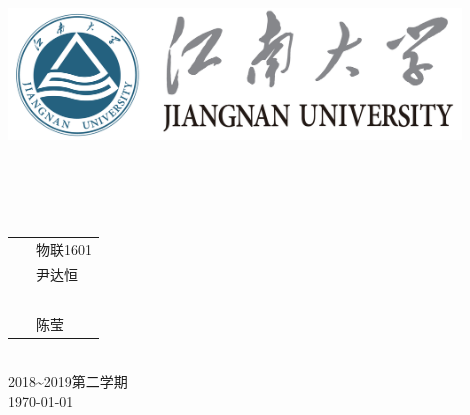 \documentclass[a4paper]{ctexart}
\begin{document}
\begin{titlepage}
	\begin{center}
    \includegraphics[width=0.9\textwidth]{figure//Njust.png}\\
    \vspace{10mm}
    \textbf{}\\[0.8cm]
    \textbf{}\\[3cm]
    \textbf{}\\
    \textbf{}\\[3cm]
	\vspace{\fill}
	\setlength{\extrarowheight}{3mm}
	{\songti{}	
		\begin{tabular}{rl}
			{\makebox[4\ccwd][s]{班\qquad 级：}}& ~\kaishu 物联1601\\
			{\makebox[4\ccwd][s]{姓\qquad 名：}}& ~\kaishu 尹达恒 \\
			{\makebox[4\ccwd][s]{学\qquad 号：}}& ~\kaishu 1030616134\\
			{\makebox[4\ccwd][s]{指导老师：}} & ~\kaishu 陈莹\\
		\end{tabular}
	}\\[2cm]
	\vspace{\fill}
	2018\textasciitilde 2019第二学期\\
	\today
	\end{center}	
\end{titlepage}
\end{document}

